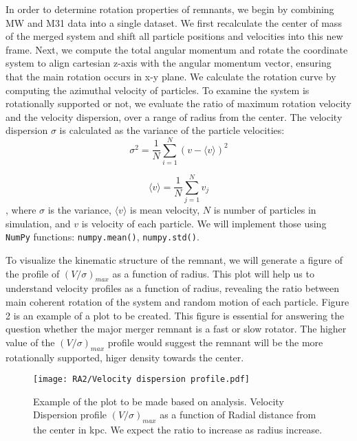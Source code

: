\documentclass[twocolumn, trackchanges]{aastex7}
\begin{document}
In order to determine rotation properties of remnants, we begin by combining MW and M31 data into a single dataset.  We first recalculate the center of mass of the merged system and shift all particle positions and velocities into this new frame. Next, we compute the total angular momentum and rotate the coordinate system to align cartesian z-axis with the angular momentum vector, ensuring that the main rotation occurs in x-y plane. We calculate the rotation curve by computing the azimuthal velocity of particles. To examine the system is rotationally supported or not, we evaluate the ratio of maximum rotation velocity and the velocity dispersion, over a range of radius from the center. The velocity dispersion $\sigma$ is calculated as the variance of the particle velocities: 
\begin{equation}
    \sigma ^2 = \frac{1}{N} \sum_{i=1}^{N} (v- \langle v \rangle)^2 
\end{equation}

\begin{equation}
    \langle v \rangle = \frac{1}{N}  \sum_{j=1}^{N} v_j
\end{equation}
, where $\sigma $ is the variance, $\langle v \rangle $ is mean velocity, $N$ is number of particles in simulation, and $v$ is velocity of each particle. We will implement those using \texttt{NumPy} functions: \texttt{numpy.mean()}, \texttt{numpy.std()}.


To visualize the kinematic structure of the remnant, we will generate a figure of the profile of $(V/\sigma)_{max}$ as a function of radius. This plot will help us to understand velocity profiles as a function of radius, revealing the ratio between main coherent rotation of the system and random motion of each particle. Figure 2 is an example of a plot to be created. This figure is essential for answering the question whether the major merger remnant is a fast or slow rotator. The higher value of the $(V/\sigma)_{max}$ profile would suggest the remnant will be the more rotationally supported, higer density towards the center.  


\begin{figure}[h]
  \centering
  \texttt{[image: RA2/Velocity dispersion profile.pdf]}
  \caption{Example of the plot to be made based on analysis. Velocity Dispersion profile $(V/\sigma)_{max}$ as a function of Radial distance from the center in kpc. We expect the ratio to increase as radius increase. }
  \label{fig:lab7example}
\end{figure}








\end{document}
